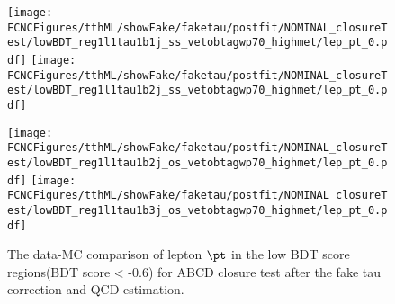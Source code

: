 \begin{figure}[H]
\centering
\texttt{[image: \\FCNCFigures/tthML/showFake/faketau/postfit/NOMINAL\_closureTest/lowBDT\_reg1l1tau1b1j\_ss\_vetobtagwp70\_highmet/lep\_pt\_0.pdf]}
\texttt{[image: \\FCNCFigures/tthML/showFake/faketau/postfit/NOMINAL\_closureTest/lowBDT\_reg1l1tau1b2j\_ss\_vetobtagwp70\_highmet/lep\_pt\_0.pdf]}

\texttt{[image: \\FCNCFigures/tthML/showFake/faketau/postfit/NOMINAL\_closureTest/lowBDT\_reg1l1tau1b2j\_os\_vetobtagwp70\_highmet/lep\_pt\_0.pdf]}
\texttt{[image: \\FCNCFigures/tthML/showFake/faketau/postfit/NOMINAL\_closureTest/lowBDT\_reg1l1tau1b3j\_os\_vetobtagwp70\_highmet/lep\_pt\_0.pdf]}


\caption{ The data-MC comparison of lepton $\pt$ in the low BDT score regions(BDT score < -0.6) for ABCD closure test after the fake tau correction and QCD estimation. }
\label{fig:closuretest}
\end{figure}
